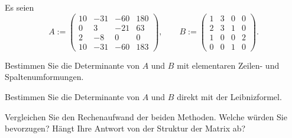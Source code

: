 \begin{Problem}
	Es seien
	\[
		A:=\begin{pmatrix} 10 & -31 & -60 & 180 \\ 0 & 3 & -21 & 63 \\ 2 & -8 & 0 & 0 \\ 10 & -31 & -60 & 183 \end{pmatrix},\qquad B := \begin{pmatrix} 1 & 3 & 0 & 0 \\ 2 & 3 & 1 & 0 \\ 1 & 0 & 0 & 2 \\ 0 & 0 & 1 & 0 \end{pmatrix} 
	.\] 
	\begin{parts}
		\item Bestimmen Sie die Determinante von $A$ und $B$ mit elementaren Zeilen- und Spaltenumformungen. 
		\item Bestimmen Sie die Determinante von $A$ und $B$ direkt mit der Leibnizformel. 
		\item Vergleichen Sie den Rechenaufwand der beiden Methoden. Welche würden Sie bevorzugen? Hängt Ihre Antwort von der Struktur der Matrix ab?  
	\end{parts}
\end{Problem}

